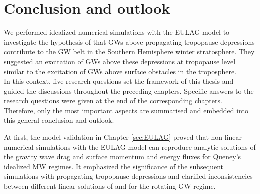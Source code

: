 \chapter{Conclusion and outlook}
%
We performed idealized numerical simulations with the EULAG model to investigate the hypothesis of \textcite[]{dornbrack_stratospheric_2022} that GWs above propagating tropopause depressions contribute to the GW belt in the Southern Hemisphere winter stratosphere. They suggested an excitation of GWs above these depressions at tropopause level similar to the excitation of GWs above surface obstacles in the troposphere.\\
In this context, five research questions set the framework of this thesis and guided the discussions throughout the preceding chapters. Specific answers to the research questions were given at the end of the corresponding chapters. Therefore, only the most important aspects are summarised and embedded into this general conclusion and outlook.

At first, the model validation in Chapter \ref{sec:EULAG} proved that non-linear numerical simulations with the EULAG model can reproduce analytic solutions of the gravity wave drag and surface momentum and energy fluxes for Queney's idealized MW regimes. It emphasized the significance of the subsequent simulations with propagating tropopause depressions and clarified inconsistencies between different linear solutions of \textcite{smith_influence_1979} and \textcite{miranda_non-linear_1992} for the rotating GW regime.

